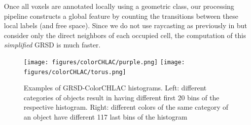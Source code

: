 \documentclass[conference]{sty/IEEEtran}
\begin{document}
Once all voxels are annotated locally using a geometric class, our
processing pipeline constructs a global feature by counting the transitions
between these local labels (and free space). Since we do not use raycasting
as previously in \cite{Humanoids} but consider only the direct neighbors
of each occupied cell, the computation of this \emph{simplified} GRSD is much faster.

\begin{figure}[htb!]
  \begin{center}
    \texttt{[image: figures/colorCHLAC/purple.png]}
    \texttt{[image: figures/colorCHLAC/torus.png]}
    \caption{Examples of GRSD-ColorCHLAC histograms. Left: different categories 
of objects result in having different first 20 bins of the respective histogram.
Right: different colors of the same category of an object have different 117 last bins 
of the histogram}
    \label{fig:grsd_cchlac}
  \end{center}
\end{figure}
\end{document}
